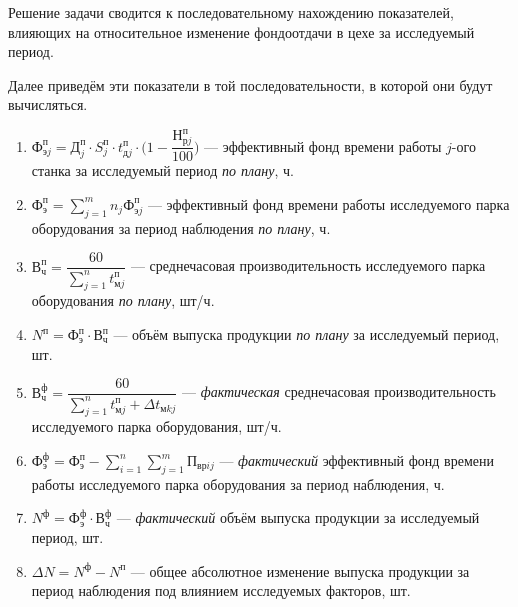 Решение задачи сводится к последовательному нахождению показателей,
влияющих на относительное изменение фондоотдачи в цехе за исследуемый период.

Далее приведём эти показатели в той последовательности, в которой они будут вычисляться.

\begin{enumerate}

  \item $ \text{Ф}^{\text{п}}_{\text{э}j} = \text{Д}^{\text{п}}_j \cdot S^{\text{п}}_j
    \cdot t^{\text{п}}_{\text{д}j} \cdot \Big(1 - \dfrac{\text{Н}^{\text{п}}_{\text{р}j}}{100} \Big) $
    --- эффективный фонд времени работы $j$-ого станка за исследуемый период \textit{по плану}, ч.

  \item $ \text{Ф}^{\text{п}}_{\text{э}} = \sum\limits_{j=1}^{m}n_j \text{Ф}^{\text{п}}_{\text{э}j} $
    --- эффективный фонд времени работы исследуемого парка оборудования за период наблюдения
    \textit{по плану}, ч.

  \item $ \text{В}^{\text{п}}_{\text{ч}} = \dfrac{60}{\sum\limits_{j=1}^{n} t^{\text{п}}_{\text{м}j}} $
    --- среднечасовая производительность исследуемого парка оборудования \textit{по плану}, шт/ч.

  \item $ N^{\text{п}} = \text{Ф}^{\text{п}}_{\text{э}} \cdot \text{В}^{\text{п}}_{\text{ч}} $
    --- объём выпуска продукции \textit{по плану} за исследуемый период, шт.

  \item $ \text{В}^{\text{ф}}_{\text{ч}} = \dfrac{60}{\sum\limits_{j=1}^{n} t^{\text{п}}_{\text{м}j}
    + \Delta t_{\text{м}kj}} $
    --- \textit{фактическая} среднечасовая производительность исследуемого парка оборудования, шт/ч.

  \item $ \text{Ф}^{\text{ф}}_{\text{э}} = \text{Ф}^{\text{п}}_{\text{э}} -
    \sum\limits_{i=1}^{n}\sum\limits_{j=1}^{m} \text{П}_{\text{вр}ij} $
    --- \textit{фактический} эффективный фонд времени работы исследуемого парка оборудования за период наблюдения, ч.

  \item $ N^{\text{ф}} = \text{Ф}^{\text{ф}}_{\text{э}} \cdot \text{В}^{\text{ф}}_{\text{ч}} $
    --- \textit{фактический} объём выпуска продукции за исследуемый период, шт.

  \item $ \Delta N = N^{\text{ф}} - N^{\text{п}} $
    --- общее абсолютное изменение выпуска продукции за период наблюдения под влиянием исследуемых факторов, шт.


\end{enumerate}
